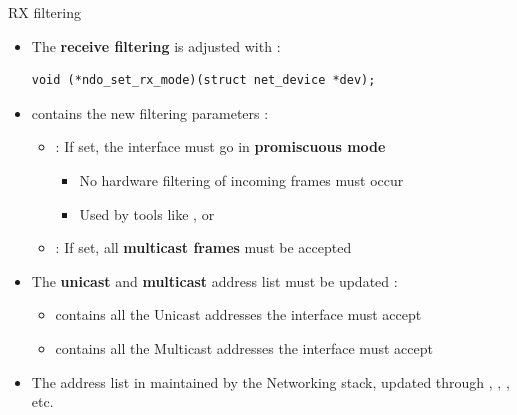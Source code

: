\begin{frame}[fragile]{RX filtering}
	\begin{itemize}
		\item The \textbf{receive filtering} is adjusted with :
	\begin{verbatim}
void (*ndo_set_rx_mode)(struct net_device *dev);
	\end{verbatim}
	\item {} contains the new filtering parameters :
		\begin{itemize}
			\item {} : If set, the interface must go in \textbf{promiscuous mode}
			\begin{itemize}
				\item No hardware filtering of incoming frames must occur
				\item Used by tools like , or 
			\end{itemize}
			\item {} : If set, all \textbf{multicast frames} must be accepted
		\end{itemize}
	\item The \textbf{unicast} and \textbf{multicast} address list must be updated :
		\begin{itemize}
			\item {} contains all the Unicast addresses the interface must accept
			\item {} contains all the Multicast addresses the interface must accept
		\end{itemize}
	\item The address list in maintained by the Networking stack, updated through , , , etc.
	\end{itemize}

\end{frame}

